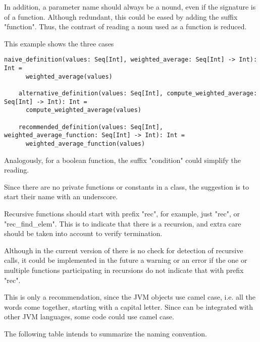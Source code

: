 In addition, a parameter name should always be a nound, even if the signature is of a function.
Although redundant, this could be eased by adding the suffix "function".
Thus, the contrast of reading a noun used as a function is reduced.

This example shows the three cases

\begin{lstlisting}[label={lst:exampleFunctionsAsParameter}]
    naive_definition(values: Seq[Int], weighted_average: Seq[Int] -> Int): Int =
      weighted_average(values)

    alternative_definition(values: Seq[Int], compute_weighted_average: Seq[Int] -> Int): Int =
      compute_weighted_average(values)

    recommended_definition(values: Seq[Int], weighted_average_function: Seq[Int] -> Int): Int =
      weighted_average_function(values)
\end{lstlisting}

Analogously, for a boolean function, the suffix "condition" could simplify the reading.

Since there are no private functions or constants in a class, the suggestion is to start their name with an underscore.

Recursive functions should start with prefix "rec", for example, just "rec", or "rec_find_elem".
This is to indicate that there is a recursion, and extra care should be taken into account to verify termination.

Although in the current version of \Soda there is no check for detection of recursive calls, it could be implemented in the future a warning or an error if the one or multiple functions participating in recursions do not indicate that with prefix "rec".

This is only a recommendation, since the JVM objects use camel case, i.e. all the words come together, starting with a capital letter.
Since \Soda can be integrated with other JVM languages, some \Soda code could use camel case.

The following table intends to summarize the naming convention.

